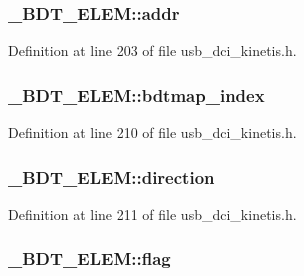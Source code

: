\subsubsection[{\texorpdfstring{addr}{addr}}]{ \+\_\+\+B\+D\+T\+\_\+\+E\+L\+E\+M\+::addr}\hypertarget{struct___b_d_t___e_l_e_m_a8fa5903b3f848e9e7eef0ea85b9aa5ef}{}\label{struct___b_d_t___e_l_e_m_a8fa5903b3f848e9e7eef0ea85b9aa5ef}


Definition at line 203 of file usb\+\_\+dci\+\_\+kinetis.\+h.

\subsubsection[{\texorpdfstring{bdtmap\+\_\+index}{bdtmap_index}}]{ \+\_\+\+B\+D\+T\+\_\+\+E\+L\+E\+M\+::bdtmap\+\_\+index}\hypertarget{struct___b_d_t___e_l_e_m_a7418a40bce7c69452bd45f76c3eeffec}{}\label{struct___b_d_t___e_l_e_m_a7418a40bce7c69452bd45f76c3eeffec}


Definition at line 210 of file usb\+\_\+dci\+\_\+kinetis.\+h.

\subsubsection[{\texorpdfstring{direction}{direction}}]{ \+\_\+\+B\+D\+T\+\_\+\+E\+L\+E\+M\+::direction}\hypertarget{struct___b_d_t___e_l_e_m_ad5d6f0b23ab5c9c48b33ccfb2edd536f}{}\label{struct___b_d_t___e_l_e_m_ad5d6f0b23ab5c9c48b33ccfb2edd536f}


Definition at line 211 of file usb\+\_\+dci\+\_\+kinetis.\+h.

\subsubsection[{\texorpdfstring{flag}{flag}}]{ \+\_\+\+B\+D\+T\+\_\+\+E\+L\+E\+M\+::flag}\hypertarget{struct___b_d_t___e_l_e_m_a8077093bb9ba956164061b60a3c58285}{}\label{struct___b_d_t___e_l_e_m_a8077093bb9ba956164061b60a3c58285}


